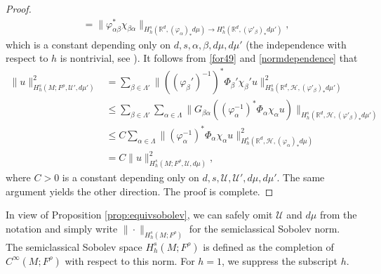 \documentclass[11pt,oneside,reqno]{amsart}
\newcommand\R{\ensuremath{\mathbb{R}}}
\theoremstyle{definition}
\numberwithin{equation}{section}
\theoremstyle{plain}
\begin{document}
\begin{proof}
\begin{equation}
\begin{aligned}
     &= \| \varphi_{\alpha \beta }^* \chi_{\beta \alpha }  \|_{H^{s}_{h}(\R^d,(\varphi_{\alpha})_{*}d\mu)\to H^{s}_{h}(\R^d,(\varphi'_{\beta})_{*}d\mu')} ,
\end{aligned}
\end{equation}
which is a constant depending only on $d,s,\alpha,\beta, d\mu,d\mu'$ (the independence with respect to $h$ is nontrivial, see \cite[Page 561]{dyatlovzworski2019resonances}). It follows from \eqref{for49} and \eqref{normdependence} that 
\begin{equation*}
\begin{aligned}
\|u\|_{H^{s}_{h}(M;F^{\rho},\mathcal{U}',d\mu')}^2&=\sum_{\beta \in \Lambda'}\| ((\varphi_{\beta}')^{-1})^*\Phi_{\beta}'\chi_{\beta}'u \|^2_{H^{s}_{h}(\R^d,\mathcal{H},(\varphi'_{\beta})_{*}d\mu')}\\
& \leq \sum_{\beta \in \Lambda'} \sum_{\alpha \in \Lambda} \|G_{\beta \alpha } ((\varphi_\alpha^{-1})^*\Phi_\alpha\chi_\alpha u)\|_{H^{s}_{h}(\R^d,\mathcal{H},(\varphi'_{\beta})_{*}d\mu')}  \\
& \leq C \sum_{\alpha \in \Lambda}\| (\varphi_{\alpha}^{-1})^*\Phi_{\alpha}\chi_{\alpha}u \|^2_{H^{s}_{h}(\R^d,\mathcal{H},(\varphi_{\alpha})_{*}d\mu)}  \\
& = C \|u\|_{H^{s}_{h}(M;F^{\rho},\mathcal{U},d\mu)}^2,
\end{aligned}
\end{equation*}
where $C>0$ is a constant depending only on $d,s,\mathcal{U}, \mathcal{U}' , d\mu,d\mu'$. The same argument yields the other direction. The proof is complete.
\end{proof}

 
In view of Proposition \ref{prop:equivsobolev}, we can safely omit $\mathcal{U}$ and $d\mu$ from the notation and  simply write $\|\cdot\|_{H^{s}_{h}(M;F^{\rho})}$ for the semiclassical Sobolev norm. The semiclassical Sobolev space $H^{s}_{h}(M;F^{\rho})$ is defined as the completion of $C^{\infty}(M;F^{\rho})$ with respect to this norm. For $h=1$, we suppress the subscript $h$. 
\end{document}

